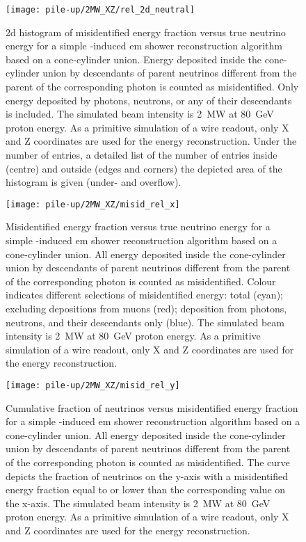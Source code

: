 \begin{figure}[htb]
	\centering
	\texttt{[image: pile-up/2MW\_XZ/rel\_2d\_neutral]}
	\caption{\gls{2d} histogram of misidentified energy fraction versus true neutrino energy for a simple \Pgpz-induced \gls{em} shower reconstruction algorithm based on a cone-cylinder union.
		Energy deposited inside the cone-cylinder union by descendants of parent neutrinos different from the parent of the corresponding \Pgpz photon is counted as misidentified.
		Only energy deposited by photons, neutrons, or any of their descendants is included.
		The simulated beam intensity is \SI{2}{\mega\watt} at \SI{80}{\giga\electronvolt} proton energy.
		As a primitive simulation of a wire readout, only X and Z coordinates are used for the energy reconstruction.
		Under the number of entries, a detailed list of the number of entries inside (centre) and outside (edges and corners) the depicted area of the histogram is given (under- and overflow).}
\end{figure}

\begin{figure}[htb]
	\centering
	\texttt{[image: pile-up/2MW\_XZ/misid\_rel\_x]}
	\caption{Misidentified energy fraction versus true neutrino energy for a simple \Pgpz-induced \gls{em} shower reconstruction algorithm based on a cone-cylinder union.
		All energy deposited inside the cone-cylinder union by descendants of parent neutrinos different from the parent of the corresponding \Pgpz photon is counted as misidentified.
		Colour indicates different selections of misidentified energy: total (cyan); excluding depositions from muons (red); deposition from photons, neutrons, and their descendants only (blue).
		The simulated beam intensity is \SI{2}{\mega\watt} at \SI{80}{\giga\electronvolt} proton energy.
		As a primitive simulation of a wire readout, only X and Z coordinates are used for the energy reconstruction.}
\end{figure}

\begin{figure}[htb]
	\centering
	\texttt{[image: pile-up/2MW\_XZ/misid\_rel\_y]}
	\caption{Cumulative fraction of neutrinos versus misidentified energy fraction for a simple \Pgpz-induced \gls{em} shower reconstruction algorithm based on a cone-cylinder union.
		All energy deposited inside the cone-cylinder union by descendants of parent neutrinos different from the parent of the corresponding \Pgpz photon is counted as misidentified.
		The curve depicts the fraction of neutrinos on the y-axis with a misidentified energy fraction equal to or lower than the corresponding value on the x-axis.
		The simulated beam intensity is \SI{2}{\mega\watt} at \SI{80}{\giga\electronvolt} proton energy.
		As a primitive simulation of a wire readout, only X and Z coordinates are used for the energy reconstruction.}
\end{figure}


